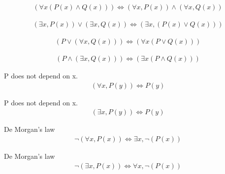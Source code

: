 \begin{prop}
\label{Proposition:forall_land_commutativity}
\begin{align*}
(\forall x (P(x) \land Q(x))) \iff (\forall x, P(x)) \land (\forall x, Q(x))
\end{align*}
\end{prop}

\begin{prop}
\label{Proposition:exists_lor_commutativity}
\begin{align*}
(\exists x, P(x)) \lor (\exists x, Q(x)) \iff (\exists x, (P(x) \lor Q(x)))
\end{align*}
\end{prop}

\begin{prop}
\label{Proposition:lor_forall_distributivity}
\begin{align*}
(P \lor (\forall x, Q(x))) \iff (\forall x (P \lor Q(x)))
\end{align*}
\end{prop}

\begin{prop}
\label{Proposition:land_exists_distributivity}
\begin{align*}
(P \land (\exists x, Q(x))) \iff (\exists x (P \land Q(x)))
\end{align*}
\end{prop}

\begin{axm}
\label{Axiom:forall_independent_variable}
P does not depend on x.
\begin{align*}
(\forall x, P(y)) \iff P(y)
\end{align*}
\end{axm}

\begin{axm}
\label{Axiom:exists_independent_variable}
P does not depend on x.
\begin{align*}
(\exists x, P(y)) \iff P(y)
\end{align*}
\end{axm}

\begin{axm}
\label{Axiom:De_Morgan_1}
De Morgan's law
\begin{align*}
\lnot (\forall x, P(x)) \iff \exists x, \lnot (P(x))
\end{align*}
\end{axm}

\begin{axm}
\label{Axiom:De_Morgan_2}
De Morgan's law
\begin{align*}
\lnot (\exists x, P(x)) \iff \forall x, \lnot (P(x))
\end{align*}
\end{axm}

